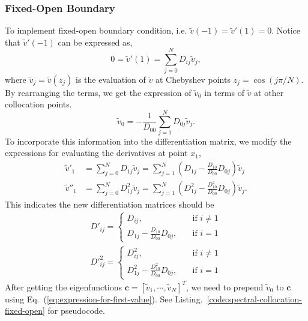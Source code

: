 \subsubsection*{Fixed-Open Boundary}
To implement fixed-open boundary condition, i.e. $\tilde{v}(-1)=\tilde{v}'(1)=0$. Notice that $\tilde{v}'(-1)$ can be expressed as,
\begin{equation}
	0 = \tilde{v}'(1) = \sum_{j=0}^{N}D_{ij}\tilde{v}_j,
\end{equation}
where $\tilde{v}_j=\tilde{v}(z_j)$ is the evaluation of $\tilde{v}$ at Chebyshev points $z_j=\cos(j\pi/N)$. By rearranging the terms, we get the expression of $\tilde{v}_0$ in terms of $\tilde{v}$ at other collocation points.
\begin{equation}
	\tilde{v}_0 = -\frac{1}{D_{00}}\sum_{j=1}^{N} D_{0j}\tilde{v}_j.
	\label{eq:expression-for-first-value}
\end{equation}
To incorporate this information into the differentiation matrix, we modify the expressions for evaluating the derivatives at point $x_1$,
\begin{align}
	\tilde{v}'_{1}  & = \sum_{j=0}^{N}D_{1j}\tilde{v}_j = \sum_{j=1}^{N}\left(D_{1j} - \frac{D_{10}}{D_{00}}D_{0j}\right)\tilde{v}_j        \\
	\tilde{v}''_{1} & = \sum_{j=0}^{N}D^2_{1j}\tilde{v}_j = \sum_{j=1}^{N}\left(D^2_{1j} - \frac{D^2_{10}}{D_{00}}D_{0j}\right)\tilde{v}_j.
\end{align}
This indicates the new differentiation matrices should be
\begin{align}
	D'_{ij} = \begin{cases}
		          D_{ij}, \quad                               & \text{if $i\neq 1$} \\
		          D_{1j} - \frac{D_{10}}{D_{00}}D_{0j}, \quad & \text{if $i=1$}
	          \end{cases} \\
	D'^2_{ij} = \begin{cases}
		            D^2_{ij}, \quad                                 & \text{if $i\neq 1$} \\
		            D^2_{1j} - \frac{D^2_{10}}{D_{00}}D_{0j}, \quad & \text{if $i=1$}
	            \end{cases}
\end{align}
After getting the eigenfunctions $\mathbf{c} = [\tilde{v}_1, \cdots, \tilde{v}_N]^T$, we need to prepend $\tilde{v}_0$ to $\mathbf{c}$ using Eq.~(\ref{eq:expression-for-first-value}). See Listing.~\ref{code:spectral-collocation-fixed-open} for pseudocode.


